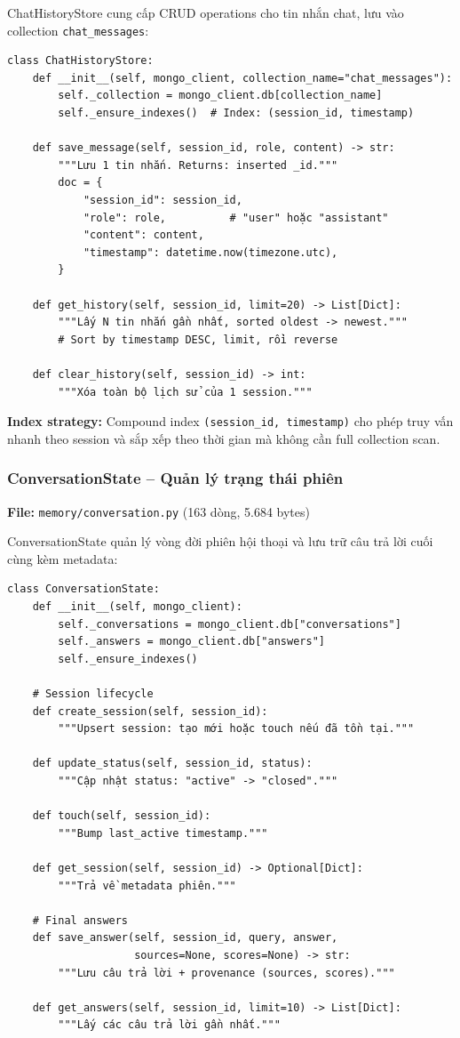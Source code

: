 \documentclass[../DoAn.tex]{subfiles}
\begin{document}
ChatHistoryStore cung cấp CRUD operations cho tin nhắn chat, lưu vào collection \texttt{chat\_messages}:
\begin{verbatim}
class ChatHistoryStore:
    def __init__(self, mongo_client, collection_name="chat_messages"):
        self._collection = mongo_client.db[collection_name]
        self._ensure_indexes()  # Index: (session_id, timestamp)

    def save_message(self, session_id, role, content) -> str:
        """Lưu 1 tin nhắn. Returns: inserted _id."""
        doc = {
            "session_id": session_id,
            "role": role,          # "user" hoặc "assistant"
            "content": content,
            "timestamp": datetime.now(timezone.utc),
        }

    def get_history(self, session_id, limit=20) -> List[Dict]:
        """Lấy N tin nhắn gần nhất, sorted oldest -> newest."""
        # Sort by timestamp DESC, limit, rồi reverse

    def clear_history(self, session_id) -> int:
        """Xóa toàn bộ lịch sử của 1 session."""
\end{verbatim}

\textbf{Index strategy:} Compound index \texttt{(session\_id, timestamp)} cho phép truy vấn nhanh theo session và sắp xếp theo thời gian mà không cần full collection scan.

\subsubsection{ConversationState -- Quản lý trạng thái phiên}
\textbf{File:} \texttt{memory/conversation.py} (163 dòng, 5.684 bytes)

ConversationState quản lý vòng đời phiên hội thoại và lưu trữ câu trả lời cuối cùng kèm metadata:
\begin{verbatim}
class ConversationState:
    def __init__(self, mongo_client):
        self._conversations = mongo_client.db["conversations"]
        self._answers = mongo_client.db["answers"]
        self._ensure_indexes()

    # Session lifecycle
    def create_session(self, session_id):
        """Upsert session: tạo mới hoặc touch nếu đã tồn tại."""

    def update_status(self, session_id, status):
        """Cập nhật status: "active" -> "closed"."""

    def touch(self, session_id):
        """Bump last_active timestamp."""

    def get_session(self, session_id) -> Optional[Dict]:
        """Trả về metadata phiên."""

    # Final answers
    def save_answer(self, session_id, query, answer,
                    sources=None, scores=None) -> str:
        """Lưu câu trả lời + provenance (sources, scores)."""

    def get_answers(self, session_id, limit=10) -> List[Dict]:
        """Lấy các câu trả lời gần nhất."""
\end{verbatim}
\end{document}
